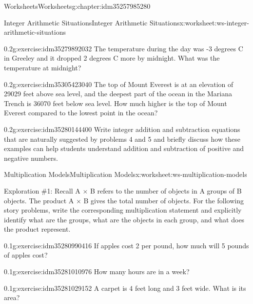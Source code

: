 \documentclass[twoside,11pt,]{book}
\begin{document}
\begin{chapterptx}{Worksheets}{}{Worksheets}{}{}{g:chapter:idm35257985280}
\begin{worksheet-section-numberless}{Integer Arithmetic Situations}{}{Integer Arithmetic Situations}{}{}{x:worksheet:ws-integer-arithmetic-situations}
\begin{divisionexercise}{4}{}{0.2}{g:exercise:idm35279892032}
The temperature during the day was -3 degrees C in Greeley and it dropped 2 degrees C more by midnight. What was the temperature at midnight?%
\end{divisionexercise}%
\begin{divisionexercise}{5}{}{0.2}{g:exercise:idm35305423040}%
The top of Mount Everest is at an elevation of 29029 feet above sea level, and the deepest part of the ocean in the Mariana Trench is 36070 feet below sea level.  How much higher is the top of Mount Everest compared to the lowest point in the ocean?%
\end{divisionexercise}%
\clearpage
\begin{divisionexercise}{6}{}{0.2}{g:exercise:idm35280144400}%
Write integer addition and subtraction equations that are naturally suggested by problems 4 and 5 and briefly discuss how these examples can help students understand addition and subtraction of positive and negative numbers.%
\end{divisionexercise}%
\end{worksheet-section-numberless}
\restoregeometry
%
%
\typeout{************************************************}
\typeout{************************************************}
%
\begin{worksheet-section-numberless}{Multiplication Models}{}{Multiplication Models}{}{}{x:worksheet:ws-multiplication-models}
\begin{introduction}{}%
Exploration \#1: Recall A \(\times \) B refers to the number of objects in A groups of B objects.  The product A \(\times \) B gives the total number of objects.  For the following story problems, write the corresponding multiplication statement and explicitly identify what are the groups, what are the objects in each group, and what does the product represent.%
\end{introduction}%
\begin{divisionexercise}{1}{}{0.1}{g:exercise:idm35280990416}%
If apples cost \textdollar{}2 per pound, how much will 5 pounds of apples cost?%
\end{divisionexercise}%
\begin{divisionexercise}{2}{}{0.1}{g:exercise:idm35281010976}%
How many hours are in a week?%
\end{divisionexercise}%
\begin{divisionexercise}{3}{}{0.1}{g:exercise:idm35281029152}%
A carpet is 4 feet long and 3 feet wide. What is its area?%

\end{divisionexercise}
\end{worksheet-section-numberless}
\end{chapterptx}
\end{document}
